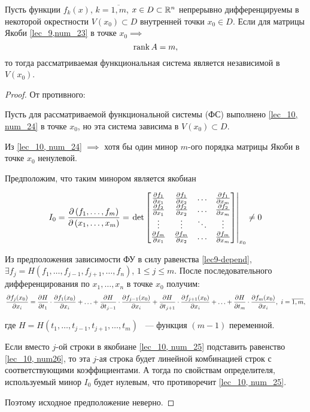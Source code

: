 \documentclass[../../main.tex]{subfiles}
\begin{document}
\begin{thm}
	Пусть функции $f_k\left(x\right)$, $k = \overline{1,m}$,
	$x \in D \subset \mathbb{R}^n$ непрерывно дифференцируемы в некоторой 
	окрестности $V(x_0) \subset D$ внутренней точки $x_0 \in D$. Если 
	для матрицы Якоби \eqref{lec_9,num_23} в точке $x_0 \implies$ 
	\begin{equation} \label{lec_10, num_24}
		\operatorname{rank} A = m,
	\end{equation}
 	то тогда рассматриваемая функциональная система 
 	является независимой в $V(x_0)$.
\end{thm}

\begin{proof}
	От противного:
	
	Пусть для рассматриваемой функциональной системы (ФС) 
	выполнено \eqref{lec_10, num_24} в точке $x_0$, но эта система 
	зависима в $V(x_0) \subset D$.
	
	Из \eqref{lec_10, num_24} $\implies$ хотя бы один минор $m$-ого 
	порядка матрицы Якоби в точке $x_0$ ненулевой.
	
	Предположим, что таким минором является якобиан
	
	\begin{equation} \label{lec_10, num_25}
		I_0 = \frac{\partial \left( f_1, \ldots, f_m \right)}{\partial  \left(x_1, 
		\ldots, x_m \right) } = \left.\det 
		\begin{bmatrix}
		\frac{\partial f_1}{\partial x_1} & \frac{\partial f_1}{\partial x_2} & \ldots & \frac{\partial f_1}{\partial x_m} \\
		\frac{\partial f_2}{\partial x_1} & \frac{\partial f_2}{\partial x_2} & \ldots & \frac{\partial f_2}{\partial x_m}\\
		\vdots & \vdots & \ddots & \vdots \\
		\frac{\partial f_m}{\partial x_1} & \frac{\partial f_m}{\partial x_2} & \ldots & \frac{\partial f_m}{\partial x_m}
		\end{bmatrix} \right|_{x_0}
		\neq 0
	\end{equation} 
	
	Из предположения зависимости ФУ в силу равенства 
	\eqref{lec9-depend},
	$\exists f_j = H( f_1, \ldots, f_{j-1}, f_{j+1}, \ldots, 
	f_n)$, $1 \le j \le m$.
	После последовательного дифференцирования по $x_1, \ldots, 
	x_n$ в точке $x_0$ получим:
	\begin{equation} \label{lec_10, num26}
		\frac{\partial f_j(x_0)}{\partial x_i} = \frac{\partial H}{\partial t_1}\cdot
		\frac{\partial f_1(x_0)}{\partial x_i} + \ldots + \frac{\partial H}{\partial  t_{j-1} } \cdot
		\frac{\partial  f_{j-1}(x_0) }{\partial x_i} + \frac{\partial H}{\partial  t_{j+1} } \cdot
		\frac{\partial  f_{j+1}(x_0) }{\partial x_i} + \ldots + \frac{\partial H}{\partial t_m} \cdot
	    \frac{\partial  f_m(x_0) }{\partial x_i},\ i = \overline{1, m},
	\end{equation}
	
	где $H = H\left( t_1, \ldots, t_{j-1}, t_{j+1}, \ldots, t_m 
	\right)$ ~--- функция $(m-1)$ переменной.
	
	Если вместо $j$-ой строки в якобиане \eqref{lec_10, num_25}
	подставить равенство \eqref{lec_10, num26}, то эта $j$-ая 
	строка будет линейной комбинацией строк с соответствующими 
	коэффициентами. А тогда по свойствам определителя, 
	используемый минор $I_0$ будет нулевым, что противоречит 
	\eqref{lec_10, num_25}.
	
	Поэтому исходное предположение неверно.
\end{proof}
\end{document}
